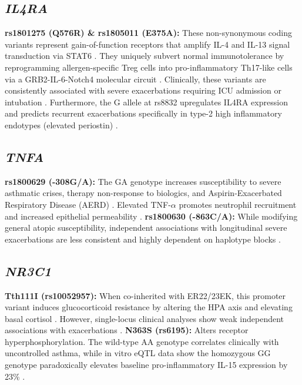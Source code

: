 \documentclass[11pt,a4paper]{article}
\begin{document}
\subsection{\textit{IL4RA}}
\textbf{rs1801275 (Q576R) \& rs1805011 (E375A):} These non-synonymous coding variants represent gain-of-function receptors that amplify IL-4 and IL-13 signal transduction via STAT6 \cite{YangWilkie2023, ChenHu2022}. They uniquely subvert normal immunotolerance by reprogramming allergen-specific Treg cells into pro-inflammatory Th17-like cells via a GRB2-IL-6-Notch4 molecular circuit \cite{BenamarHarb2022}. Clinically, these variants are consistently associated with severe exacerbations requiring ICU admission or intubation \cite{KimChang2022, SonPark2022, MowahediAramesh2024}. Furthermore, the G allele at rs8832 upregulates IL4RA expression and predicts recurrent exacerbations specifically in type-2 high inflammatory endotypes (elevated periostin) \cite{HyodoMasuko2022}.

\subsection{\textit{TNFA}}
\textbf{rs1800629 (-308G/A):} The GA genotype increases susceptibility to severe asthmatic crises, therapy non-response to biologics, and Aspirin-Exacerbated Respiratory Disease (AERD) \cite{AlAhmadAli2025, PavnRomeroResndizHernndez2017}. Elevated TNF-$\alpha$ promotes neutrophil recruitment and increased epithelial permeability \cite{XiaWang2022, ZhuZhang2020}.
\textbf{rs1800630 (-863C/A):} While modifying general atopic susceptibility, independent associations with longitudinal severe exacerbations are less consistent and highly dependent on haplotype blocks \cite{RazaghianParvaneh2023}.

\subsection{\textit{NR3C1}}
\textbf{Tth111I (rs10052957):} When co-inherited with ER22/23EK, this promoter variant induces glucocorticoid resistance by altering the HPA axis and elevating basal cortisol \cite{MohamedAbdelRehim2015, ChengDai2016}. However, single-locus clinical analyses show weak independent associations with exacerbations \cite{FuFu2018}.
\textbf{N363S (rs6195):} Alters receptor hyperphosphorylation. The wild-type AA genotype correlates clinically with uncontrolled asthma, while in vitro eQTL data show the homozygous GG genotype paradoxically elevates baseline pro-inflammatory IL-15 expression by 23\% \cite{PANEKJONAKOWSKI2016, KhaleelFalih2025}.
\end{document}
